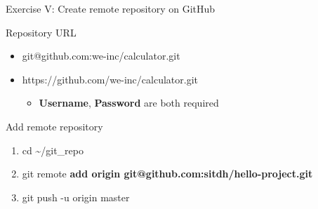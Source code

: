 \documentclass{beamer}
\begin{document}
\begin{frame}{Exercise V: Create remote repository on GitHub}
\end{frame}

\begin{frame}{Repository URL}
    \begin{itemize}
        \item<1-> \Large{git@github.com:we-inc/calculator.git}
        \item<1-> \Large{https://github.com/we-inc/calculator.git}
        \begin{itemize}
            \item<2-> \Large{\textbf{Username}, \textbf{Password} are both required}
        \end{itemize}
    \end{itemize}
\end{frame}

\begin{frame}{Add remote repository}
    \begin{enumerate}[\$]
        \item<1-> \Large{cd {\textasciitilde}/git\_repo}
        \item<2-> \Large{git remote \textbf{add origin git@github.com:sitdh/hello-project.git}}
        \item<3-> \Large{git push -u origin master}
    \end{enumerate}
\end{frame}
\end{document}
